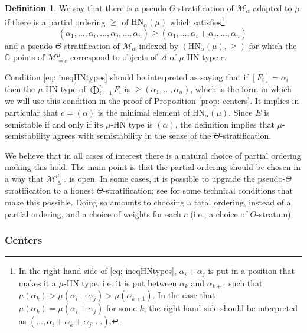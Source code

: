 \documentclass[12pt]{amsart}
\theoremstyle{definition}
\newtheorem{definition}{Definition}[section]
\newcommand{\BC}{{\mathbb{C}}}
\newcommand{\CA}{{\mathcal A}}
\newcommand{\CM}{{\mathcal M}}
\newcommand{\1}{\mathbf 1}
\newcommand{\HN}{\mathrm{HN}}
\begin{document}
\begin{definition}\label{def: stratificationadaptedto}
    We say that there is a pseudo $\Theta$-stratification of $\CM_\alpha$ adapted to $\mu$ if there is a partial ordering $\geq$ of $\HN_\alpha(\mu)$ which satisfies\footnote{In the right hand side of \eqref{eq: ineqHNtypes}, $\alpha_i+\alpha_j$ is put in a position that makes it a $\mu$-HN type, i.e. it is put between $\alpha_k$ and $\alpha_{k+1}$ such that $\mu(\alpha_k)>\mu(\alpha_i+\alpha_j)>\mu(\alpha_{k+1})$. In the case that $\mu(\alpha_k)=\mu(\alpha_i+\alpha_j)$ for some $k$, the right hand side should be interpreted as $(\ldots, \alpha_i+\alpha_k+\alpha_j, \ldots)$.}
     \begin{equation}\label{eq: ineqHNtypes}
    (\alpha_1, \ldots, \alpha_i, \ldots, \alpha_{j}, \ldots, \alpha_n)\geq (\alpha_1, \ldots, \alpha_{i}+\alpha_{j}, \ldots, \alpha_n)\, \end{equation}
   and a pseudo $\Theta$-stratification of $\CM_\alpha$ indexed by $(\HN_\alpha(\mu), \geq)$ for which the $\BC$-points of $\CM_{=c}^\mu$ correspond to objects of $\CA$ of $\mu$-HN type $c$.
\end{definition}

  Condition \eqref{eq: ineqHNtypes} should be interpreted as saying that if $[F_i]=\alpha_i$ then the $\mu$-HN type of $\bigoplus_{i=1}^nF_i$ is $\geq\!(\alpha_1, \ldots, \alpha_n)$, which is the form in which we will use this condition in the proof of Proposition \ref{prop: centers}. It implies in particular that $c=(\alpha)$ is the minimal element of $\HN_\alpha(\mu)$. Since $E$ is semistable if and only if its $\mu$-HN type is $(\alpha)$, the definition implies that $\mu$-semistability agrees with semistability in the sense of the $\Theta$-stratification.

We believe that in all cases of interest there is a natural choice of partial ordering making this hold. The main point is that the partial ordering should be chosen in a way that $\CM_{\leq c}^\mu$ is open. In some cases, it is possible to upgrade the pseudo-$\Theta$ stratification to a honest $\Theta$-stratification; see \cite[Theorem 2.2.2]{HLstructure} for some technical conditions that make this possible. Doing so amounts to choosing a total ordering, instead of a partial ordering, and a choice of weights for each $c$ (i.e., a choice of $\Theta$-stratum).

\subsubsection{Centers}\label{subsubsec: centers}
\end{document}
